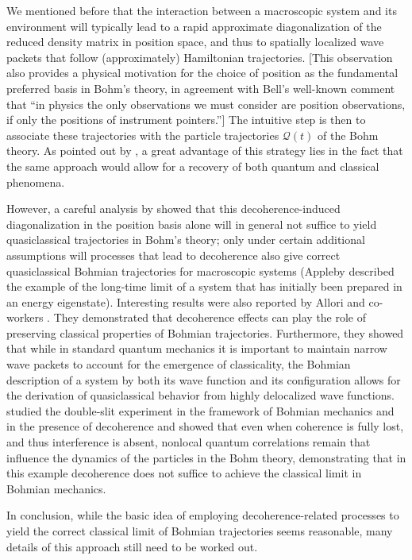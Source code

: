 \documentclass[rmp,aps,amsmath,amsfonts,noshowkeys,noshowpacs,12pt]{revtex4}
\begin{document}
We mentioned before that the interaction between a macroscopic system
and its environment will typically lead to a rapid approximate
diagonalization of the reduced density matrix in position space, and
thus to spatially localized wave packets that follow (approximately)
Hamiltonian trajectories. [This observation also provides a physical
motivation for the choice of position as the fundamental preferred
basis in Bohm's theory, in agreement with Bell's
\citeyearpar{Bell:1982:ag} well-known comment that ``in physics the
only observations we must consider are position observations, if only
the positions of instrument pointers.''] The intuitive step is then to
associate these trajectories with the particle trajectories
$\mathcal{Q}(t)$ of the Bohm theory. As pointed out by
\citet{Bacciagaluppi:2003:az}, a great advantage of this strategy lies
in the fact that the same approach would allow for a recovery of both
quantum and classical phenomena.

However, a careful analysis by \citet{Appleby:1999:zs} showed that
this decoherence-induced diagonalization in the position basis alone
will in general not suffice to yield quasiclassical trajectories in
Bohm's theory; only under certain additional assumptions will
processes that lead to decoherence also give correct quasiclassical
Bohmian trajectories for macroscopic systems (Appleby described the
example of the long-time limit of a system that has initially been
prepared in an energy eigenstate).  Interesting results were also
reported by Allori and co-workers
\citep{Allori:2001:po,Allori:2001:tc,Allori:2001:vl}. They
demonstrated that decoherence effects can play the role of
preserving classical properties of Bohmian trajectories. Furthermore,
they showed that while in standard quantum mechanics it is important
to maintain narrow wave packets to account for the emergence of
classicality, the Bohmian description of a system by both its wave
function and its configuration allows for the derivation of
quasiclassical behavior from highly delocalized wave functions.
\citet{Sanz:2003:za} studied the double-slit experiment in the
framework of Bohmian mechanics and in the presence of decoherence and
showed that even when coherence is fully lost, and thus interference is
absent, nonlocal quantum correlations remain that influence the
dynamics of the particles in the Bohm theory, demonstrating that in
this example decoherence does not suffice to achieve the classical
limit in Bohmian mechanics.

In conclusion, while the basic idea of employing decoherence-related
processes to yield the correct classical limit of Bohmian trajectories
seems reasonable, many details of this approach still need to be
worked out.
\end{document}
